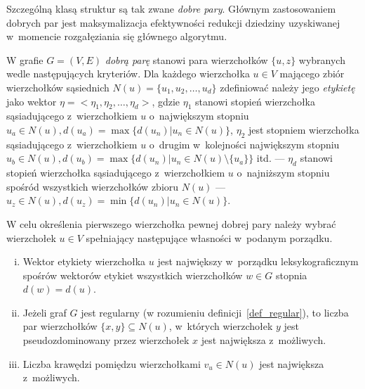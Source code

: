 \par{
  Szczególną klasą struktur są tak zwane \emph{dobre pary}.
  Głównym zastosowaniem dobrych par jest maksymalizacja efektywności redukcji dziedziny uzyskiwanej w~momencie rozgałęziania się głównego algorytmu.
  \begin{definition}
    W grafie $G=(V, E)$ \emph{dobrą parę} stanowi para wierzchołków $\{u, z\}$ wybranych wedle następujących kryteriów.
    Dla każdego wierzchołka $u \in V$ mającego zbiór wierzchołków sąsiednich $N(u)=\{u_1, u_2, \ldots, u_d\}$ zdefiniować należy jego \emph{etykietę} jako wektor $\eta=<\eta_1, \eta_2, \ldots, \eta_d>$, gdzie $\eta_1$ stanowi stopień wierzchołka sąsiadującego z~wierzchołkiem $u$ o~największym stopniu $u_{a} \in N(u), d(u_{a})=\max\{d(u_n) | u_n \in N(u)\}$, $\eta_2$ jest stopniem wierzchołka sąsiadującego z~wierzchołkiem $u$ o~drugim w~kolejności największym stopniu $u_{b} \in N(u), d(u_{b})=\max\{d(u_n) | u_n \in N(u) \setminus \{u_{a}\}\}$ itd. --- $\eta_d$ stanowi stopień wierzchołka sąsiadującego z~wierzchołkiem $u$ o~najniższym stopniu spośród wszystkich wierzchołków zbioru $N(u)$ --- $u_{z} \in N(u), d(u_{z})=\min\{d(u_n) | u_n \in N(u)\}$.

    W celu określenia pierwszego wierzchołka pewnej dobrej pary należy wybrać wierzchołek $u \in V$ spełniający następujące własności w~podanym porządku.
    \begin{enumerate}[(i)]
      \item Wektor etykiety wierzchołka $u$ jest największy w~porządku leksykograficznym spośrów wektorów etykiet wszystkich wierzchołków $w \in G$ stopnia $d(w)=d(u)$.
      \item  Jeżeli graf $G$ jest regularny (w rozumieniu definicji~\ref{def_regular}), to liczba par wierzchołków $\{x, y\} \subseteq N(u)$, w~których wierzchołek $y$ jest pseudozdominowany przez wierzchołek $x$ jest największa z~możliwych.
      \item Liczba krawędzi pomiędzu wierzchołkami $v_u \in N(u)$ jest największa z~możliwych.
    \end{enumerate}


\end{definition}}
